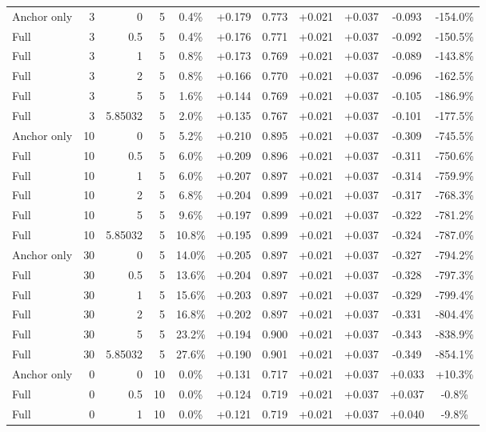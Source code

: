\begin{table}[htbp]
\begin{tabular}{lrrrccccccc}
Anchor only & 3 & 0 & 5 & 0.4\% & +0.179 & 0.773 & +0.021 & +0.037 & -0.093 & -154.0\% \\
Full & 3 & 0.5 & 5 & 0.4\% & +0.176 & 0.771 & +0.021 & +0.037 & -0.092 & -150.5\% \\
Full & 3 & 1 & 5 & 0.8\% & +0.173 & 0.769 & +0.021 & +0.037 & -0.089 & -143.8\% \\
Full & 3 & 2 & 5 & 0.8\% & +0.166 & 0.770 & +0.021 & +0.037 & -0.096 & -162.5\% \\
Full & 3 & 5 & 5 & 1.6\% & +0.144 & 0.769 & +0.021 & +0.037 & -0.105 & -186.9\% \\
Full & 3 & 5.85032 & 5 & 2.0\% & +0.135 & 0.767 & +0.021 & +0.037 & -0.101 & -177.5\% \\
Anchor only & 10 & 0 & 5 & 5.2\% & +0.210 & 0.895 & +0.021 & +0.037 & -0.309 & -745.5\% \\
Full & 10 & 0.5 & 5 & 6.0\% & +0.209 & 0.896 & +0.021 & +0.037 & -0.311 & -750.6\% \\
Full & 10 & 1 & 5 & 6.0\% & +0.207 & 0.897 & +0.021 & +0.037 & -0.314 & -759.9\% \\
Full & 10 & 2 & 5 & 6.8\% & +0.204 & 0.899 & +0.021 & +0.037 & -0.317 & -768.3\% \\
Full & 10 & 5 & 5 & 9.6\% & +0.197 & 0.899 & +0.021 & +0.037 & -0.322 & -781.2\% \\
Full & 10 & 5.85032 & 5 & 10.8\% & +0.195 & 0.899 & +0.021 & +0.037 & -0.324 & -787.0\% \\
Anchor only & 30 & 0 & 5 & 14.0\% & +0.205 & 0.897 & +0.021 & +0.037 & -0.327 & -794.2\% \\
Full & 30 & 0.5 & 5 & 13.6\% & +0.204 & 0.897 & +0.021 & +0.037 & -0.328 & -797.3\% \\
Full & 30 & 1 & 5 & 15.6\% & +0.203 & 0.897 & +0.021 & +0.037 & -0.329 & -799.4\% \\
Full & 30 & 2 & 5 & 16.8\% & +0.202 & 0.897 & +0.021 & +0.037 & -0.331 & -804.4\% \\
Full & 30 & 5 & 5 & 23.2\% & +0.194 & 0.900 & +0.021 & +0.037 & -0.343 & -838.9\% \\
Full & 30 & 5.85032 & 5 & 27.6\% & +0.190 & 0.901 & +0.021 & +0.037 & -0.349 & -854.1\% \\
Anchor only & 0 & 0 & 10 & 0.0\% & +0.131 & 0.717 & +0.021 & +0.037 & +0.033 & +10.3\% \\
Full & 0 & 0.5 & 10 & 0.0\% & +0.124 & 0.719 & +0.021 & +0.037 & +0.037 & -0.8\% \\
Full & 0 & 1 & 10 & 0.0\% & +0.121 & 0.719 & +0.021 & +0.037 & +0.040 & -9.8\% \\

\end{tabular}
\end{table}
